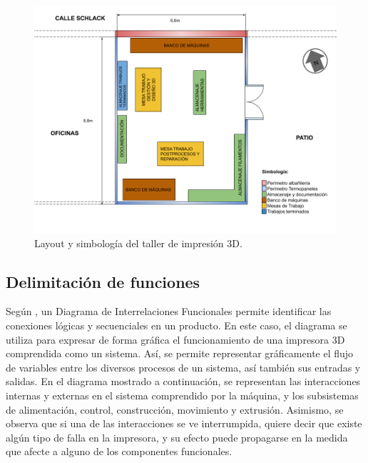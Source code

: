 \begin{figure}[H]
\centering
\includegraphics[scale=0.4]{images/layout.png}
\caption{Layout y simbología del taller de impresión 3D.}
\end{figure}

\subsection{Delimitación de funciones}

Según \cite{unit2009}, un Diagrama de Interrelaciones Funcionales permite identificar las conexiones lógicas y secuenciales en un producto. En este caso, el diagrama se utiliza para expresar de forma gráfica el funcionamiento de una impresora 3D comprendida como un sistema. Así, se permite representar gráficamente el flujo de variables entre los diversos procesos de un sistema, así también sus entradas y salidas. En el diagrama mostrado a continuación, se representan las interacciones internas y externas en el sistema comprendido por la máquina, y los subsistemas de alimentación, control, construcción, movimiento y extrusión. Asimismo, se observa que si una de las interacciones se ve interrumpida, quiere decir que existe algún tipo de falla en la impresora, y su efecto puede propagarse en la medida que afecte a alguno de los componentes funcionales.

